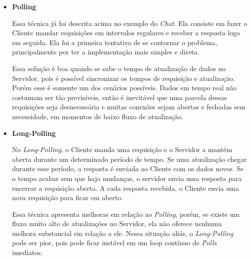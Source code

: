 \documentclass[a4paper,12pt]{article}
\begin{document}
\begin{itemize}

    \item \textbf{Polling}

    Essa técnica já foi descrita acima no exemplo do \emph{Chat}. Ela consiste em fazer o Cliente mandar requisições em intervalos regulares e receber a resposta logo em seguida. Ela foi a primeira tentativa de se contornar o problema, principalmente por ter a implementação mais simples e direta.

    Essa solução é boa quando se sabe o tempo de atualização de dados no Servidor, pois é possível sincronizar os tempos de requisição e atualização. Porém esse é somente um dos cenários possíveis. Dados em tempo real não costumam ser tão previsíveis, então é inevitável que uma parcela dessas requisições seja desnecessária e muitas conexões sejam abertas e fechadas sem necessidade, em momentos de baixo fluxo de atualização.


    \item \textbf{Long-Polling}

    No \emph{Long-Polling}, o Cliente manda uma requisição e o Servidor a mantém aberta durante um determinado período de tempo. Se uma atualização chegar durante esse período, a resposta é enviada ao Cliente com os dados novos. Se o tempo acabar sem que haja mudanças, o servidor envia uma resposta para encerrar a requisição aberta. A cada resposta recebida, o Cliente envia uma nova requisição para ficar em aberto.

    Essa técnica apresenta melhoras em relação ao \emph{Polling}, porém, se existe um fluxo muito alto de atualizações no Servidor, ela não oferece nenhuma melhora substancial em relação a ele. Nessa situação aliás, o \emph{Long-Polling} pode ser pior, pois pode ficar instável em um loop contínuo de \emph{Polls} imediatos.





\end{itemize}
\end{document}
